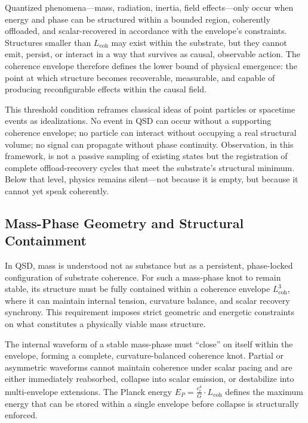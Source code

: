 \documentclass[entropy,article,submit,pdftex,oneauthor]{Definitions/mdpi}
\begin{document}
Quantized phenomena—mass, radiation, inertia, field effects—only occur when energy and phase can be structured within a bounded region, coherently offloaded, and scalar-recovered in accordance with the envelope’s constraints. Structures smaller than \texorpdfstring{\( L_{\text{coh}} \)}{Lcoh} may exist within the substrate, but they cannot emit, persist, or interact in a way that survives as causal, observable action. The coherence envelope therefore defines the lower bound of physical emergence: the point at which structure becomes recoverable, measurable, and capable of producing reconfigurable effects within the causal field.

This threshold condition reframes classical ideas of point particles or spacetime events as idealizations. No event in QSD can occur without a supporting coherence envelope; no particle can interact without occupying a real structural volume; no signal can propagate without phase continuity. Observation, in this framework, is not a passive sampling of existing states but the registration of complete offload-recovery cycles that meet the substrate’s structural minimum. Below that level, physics remains silent—not because it is empty, but because it cannot yet speak coherently.
\subsection{Mass-Phase Geometry and Structural Containment}

In QSD, mass is understood not as substance but as a persistent, phase-locked configuration of substrate coherence. For such a mass-phase knot to remain stable, its structure must be fully contained within a coherence envelope \texorpdfstring{\( L_{\text{coh}}^3 \)}{Lcoh\^{}3}, where it can maintain internal tension, curvature balance, and scalar recovery synchrony. This requirement imposes strict geometric and energetic constraints on what constitutes a physically viable mass structure.

The internal waveform of a stable mass-phase must “close” on itself within the envelope, forming a complete, curvature-balanced coherence knot. Partial or asymmetric waveforms cannot maintain coherence under scalar pacing and are either immediately reabsorbed, collapse into scalar emission, or destabilize into multi-envelope extensions. The Planck energy \texorpdfstring{\( E_P = \frac{c_t^4}{G} \cdot L_{\text{coh}} \)}{Ep = (ct\^{}4 / G) * Lcoh} defines the maximum energy that can be stored within a single envelope before collapse is structurally enforced.
\end{document}
